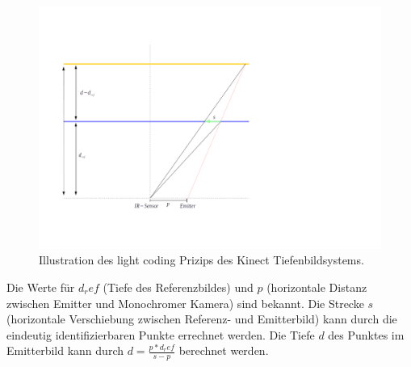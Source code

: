 			\begin{figure}[H]
			\centering
			\includegraphics[width=1.2\linewidth]{../media/kinect-depth-principle}
			\caption{Illustration des light coding Prizips des Kinect Tiefenbildsystems.}
			\label{fig:kinect-depth-principle}
			\end{figure}
			Die Werte für $d_ref$ (Tiefe des Referenzbildes) und $p$ (horizontale Distanz zwischen Emitter und Monochromer Kamera) sind bekannt. Die Strecke $s$ (horizontale Verschiebung zwischen Referenz- und Emitterbild) kann durch die eindeutig identifizierbaren Punkte errechnet werden. Die Tiefe $d$ des Punktes im Emitterbild kann durch $d = \frac{p*d_ref}{s-p}$ berechnet werden.\\
			\cite{kinect-uug-chem}

			

